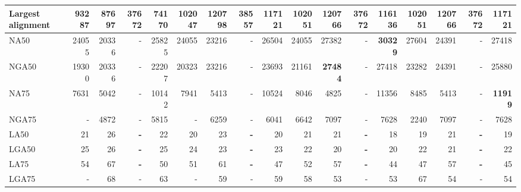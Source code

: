 \documentclass[12pt,a4paper]{article}
\begin{document}
\begin{table}[ht]
\begin{center}
\begin{tabular}{|l*{16}{|r}|}
Largest alignment & 93287 & 87697 & 37672 & 74170 & 102047 & {\bf 120798} & 38557 & 117121 & 102051 & 120766 & 37672 & 116136 & 102051 & 120766 & 37672 & 117121 \\ \hline
NA50 & 24055 & 20336 & - & 25825 & 24055 & 23216 & - & 26504 & 24055 & 27382 & - & {\bf 30329} & 27604 & 24391 & - & 27418 \\ \hline
NGA50 & 19300 & 20336 & - & 22207 & 20323 & 23216 & - & 23693 & 21161 & {\bf 27484} & - & 27418 & 23282 & 24391 & - & 25880 \\ \hline
NA75 & 7631 & 5042 & - & 10142 & 7941 & 5413 & - & 10524 & 8046 & 4825 & - & 11356 & 8485 & 5413 & - & {\bf 11919} \\ \hline
NGA75 & - & 4872 & - & 5815 & - & 6259 & - & 6041 & 6642 & 7097 & - & 7628 & 2240 & 7097 & - & 7628 \\ \hline
LA50 & 21 & 26 & {\bf -} & 22 & 20 & 23 & {\bf -} & 20 & 21 & 21 & {\bf -} & 18 & 19 & 21 & {\bf -} & 19 \\ \hline
LGA50 & 25 & 26 & {\bf -} & 25 & 24 & 23 & {\bf -} & 23 & 22 & 20 & {\bf -} & 20 & 22 & 21 & {\bf -} & 22 \\ \hline
LA75 & 54 & 67 & {\bf -} & 50 & 51 & 61 & {\bf -} & 47 & 52 & 57 & {\bf -} & 44 & 47 & 57 & {\bf -} & 45 \\ \hline
LGA75 & - & 68 & - & 63 & - & 59 & - & 59 & 58 & 53 & - & 53 & 67 & 54 & - & 54 \\ \hline
\end{tabular}
\end{center}
\end{table}
\end{document}
